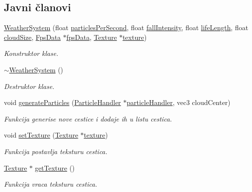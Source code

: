 \subsection*{Javni članovi}
\begin{DoxyCompactItemize}
\item 
\hyperlink{classparticle_1_1WeatherSystem_a2ff7884009380a886ea3d5d5a2b8e765}{Weather\+System} (float \hyperlink{classparticle_1_1WeatherSystem_ad2bd921d15667d8866d64fa633d76d0f}{particles\+Per\+Second}, float \hyperlink{classparticle_1_1WeatherSystem_aceaf5d329722c25c744bf3cbdc155295}{fall\+Intensity}, float \hyperlink{classparticle_1_1WeatherSystem_a0aa06ba52db7729e12657baf726fb116}{life\+Length}, float \hyperlink{classparticle_1_1WeatherSystem_a64e9626cc1511271c24ff62a1c31200f}{cloud\+Size}, \hyperlink{classutility_1_1FpsData}{Fps\+Data} $\ast$\hyperlink{classparticle_1_1WeatherSystem_adefe5a2956dfd92f8271ed0e8c70799e}{fps\+Data}, \hyperlink{classtexture_1_1Texture}{Texture} $\ast$\hyperlink{classparticle_1_1WeatherSystem_a8fbccea8de57ff87bdd606aa6e95cbab}{texture})
\begin{DoxyCompactList}\small\item\em Konstruktor klase. \end{DoxyCompactList}\item 
\hyperlink{classparticle_1_1WeatherSystem_ac2a0b57d1870183c56da2aff9021ae6e}{$\sim$\+Weather\+System} ()
\begin{DoxyCompactList}\small\item\em Destruktor klase. \end{DoxyCompactList}\item 
void \hyperlink{classparticle_1_1WeatherSystem_ac26bba944fcc147b49f12df6d11b53e5}{generate\+Particles} (\hyperlink{classparticle_1_1ParticleHandler}{Particle\+Handler} $\ast$\hyperlink{classparticle_1_1WeatherSystem_a0f24302815bf5a77140b26d015fefdbe}{particle\+Handler}, vec3 cloud\+Center)
\begin{DoxyCompactList}\small\item\em Funkcija generise nove cestice i dodaje ih u listu cestica. \end{DoxyCompactList}\item 
void \hyperlink{classparticle_1_1WeatherSystem_a5e9826ba8ab1324f9b4df5124d058ddd}{set\+Texture} (\hyperlink{classtexture_1_1Texture}{Texture} $\ast$\hyperlink{classparticle_1_1WeatherSystem_a8fbccea8de57ff87bdd606aa6e95cbab}{texture})
\begin{DoxyCompactList}\small\item\em Funkcija postavlja teksturu cestica. \end{DoxyCompactList}\item 
\hyperlink{classtexture_1_1Texture}{Texture} $\ast$ \hyperlink{classparticle_1_1WeatherSystem_aba0914ccb5a062a4b7d54c17d107c543}{get\+Texture} ()
\begin{DoxyCompactList}\small\item\em Funkcija vraca teksturu cestica. \end{DoxyCompactList}\end{DoxyCompactItemize}
